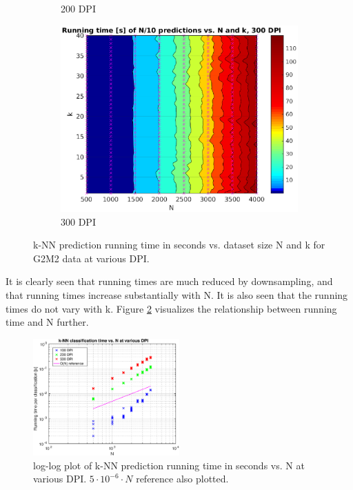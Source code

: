 \begin{figure}[h]
\begin{subfigure}{0.32\textwidth}
		\caption{200 DPI}
	\end{subfigure}
	\begin{subfigure}{0.32\textwidth}
		\includegraphics[width = \textwidth]{img/knn-runningTimeVsKVSN-G2M2-dpi300}
		\caption{300 DPI}
	\end{subfigure}
	\caption{
		k-NN prediction running time in seconds
		vs. dataset size N and k for G2M2 data at various DPI.
		}
	\label{fig:knn-runningtime-vs-n-and-k}
\end{figure}

It is clearly seen that running times are much reduced by downsampling,
and that running times increase substantially with N. It is also seen that
the running times do not vary with k.
Figure \ref{fig:knn-runningtime-vs-n-loglog} visualizes the relationship
between running time and N further.
\begin{figure}[h]
	\centering
	\includegraphics[width = 0.5\textwidth]{img/knn-runningTimeVsNVsDPI-G2M2}
	\caption[k-NN prediction running time in seconds vs. N at various DPI.]{
		log-log plot of k-NN prediction running time in seconds vs. N at various DPI.
		\(5\cdot{}10^{-6}\cdot{}N\) reference also plotted.
	}
	\label{fig:knn-runningtime-vs-n-loglog}
\end{figure}

